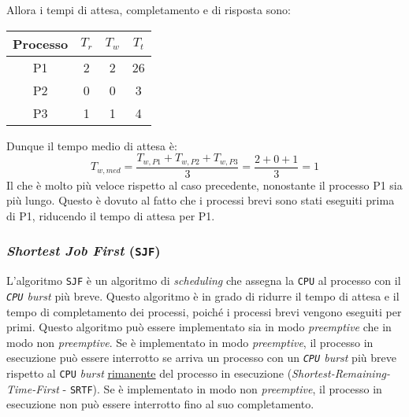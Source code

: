             Allora i tempi di attesa, completamento e di risposta sono:
            \begin{table}[H]
                \centering
                \begin{tabular}{|c|c|c|c|}
                    \hline
                    \textbf{Processo} & \textbf{$T_r$} & \textbf{$T_w$} & \textbf{$T_t$} \\ \hline
                    P1 & 2 & 2 & 26 \\ \hline
                    P2 & 0 & 0 & 3 \\ \hline
                    P3 & 1 & 1 & 4 \\ \hline
                \end{tabular}
            \end{table}
            Dunque il tempo medio di attesa è:
            $$
                T_{w,med} = \frac{T_{w,P1} + T_{w,P2} + T_{w,P3}}{3} = \frac{2 + 0 + 1}{3} = 1
            $$
            Il che è molto più veloce rispetto al caso precedente, nonostante il processo P1 sia più lungo. Questo è dovuto al fatto che i processi brevi sono stati eseguiti prima di P1, riducendo il tempo di attesa per P1.
        \subsubsection{\textit{Shortest Job First} (\texttt{SJF})}
            L'algoritmo \texttt{SJF} è un algoritmo di \textit{scheduling} che assegna la \texttt{CPU} al processo con il \textit{\texttt{CPU} burst} più breve. Questo algoritmo è in grado di ridurre il tempo di attesa e il tempo di completamento dei processi, poiché i processi brevi vengono eseguiti per primi. Questo algoritmo può essere implementato sia in modo \textit{preemptive} che in modo non \textit{preemptive}. Se è implementato in modo \textit{preemptive}, il processo in esecuzione può essere interrotto se arriva un processo con un \textit{\texttt{CPU} burst} più breve rispetto al \texttt{CPU} \textit{burst} \underline{rimanente} del processo in esecuzione (\textit{Shortest-Remaining-Time-First} - \texttt{SRTF}). Se è implementato in modo non \textit{preemptive}, il processo in  esecuzione non può essere interrotto fino al suo completamento.
